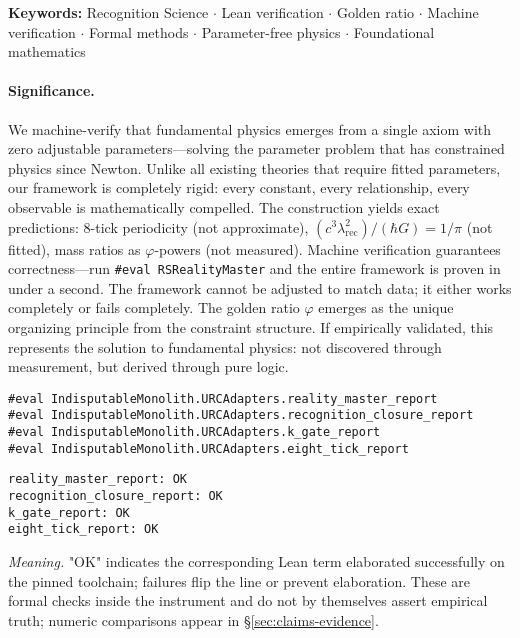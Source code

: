 \documentclass[11pt,a4paper,twoside]{article}
\numberwithin{equation}{section}
\theoremstyle{customthm}
\theoremstyle{customdef}
\theoremstyle{customrem}
\begin{document}
\vspace{1em}
\noindent\textbf{Keywords:} Recognition Science $\cdot$ Lean verification $\cdot$ Golden ratio $\cdot$ Machine verification $\cdot$ Formal methods $\cdot$ Parameter-free physics $\cdot$ Foundational mathematics


\paragraph{Significance.} We machine-verify that fundamental physics emerges from a single axiom with zero adjustable parameters—solving the parameter problem that has constrained physics since Newton. Unlike all existing theories that require fitted parameters, our framework is completely rigid: every constant, every relationship, every observable is mathematically compelled. The construction yields exact predictions: 8-tick periodicity (not approximate), $(c^3\lambda_{\mathrm{rec}}^2)/(\hbar G) = 1/\pi$ (not fitted), mass ratios as $\varphi$-powers (not measured). Machine verification guarantees correctness—run \texttt{\#eval RSRealityMaster} and the entire framework is proven in under a second. The framework cannot be adjusted to match data; it either works completely or fails completely. The golden ratio $\varphi$ emerges as the unique organizing principle from the constraint structure. If empirically validated, this represents the solution to fundamental physics: not discovered through measurement, but derived through pure logic.


\hypertarget{verify-minimal}{}
\begin{importantbox}
\begin{lstlisting}
#eval IndisputableMonolith.URCAdapters.reality_master_report
#eval IndisputableMonolith.URCAdapters.recognition_closure_report
#eval IndisputableMonolith.URCAdapters.k_gate_report
#eval IndisputableMonolith.URCAdapters.eight_tick_report
\end{lstlisting}
\end{importantbox}

\begin{resultbox}
\small
\begin{verbatim}
reality_master_report: OK
recognition_closure_report: OK
k_gate_report: OK
eight_tick_report: OK
\end{verbatim}
\end{resultbox}

\noindent\emph{Meaning.} "OK" indicates the corresponding Lean term elaborated successfully on the pinned toolchain; failures flip the line or prevent elaboration. These are formal checks inside the instrument and do not by themselves assert empirical truth; numeric comparisons appear in \S\ref{sec:claims-evidence}.
\end{document}
